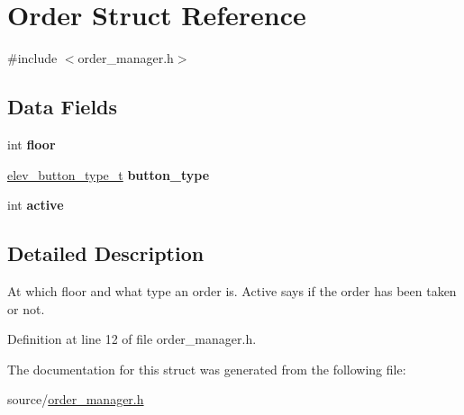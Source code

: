 \hypertarget{structOrder}{}\section{Order Struct Reference}
\label{structOrder}


{\ttfamily \#include $<$order\+\_\+manager.\+h$>$}

\subsection*{Data Fields}
\begin{DoxyCompactItemize}
\item 
int {\bfseries floor}\hypertarget{structOrder_a5243dc659272f25ee0b39a569b9bbd43}{}\label{structOrder_a5243dc659272f25ee0b39a569b9bbd43}

\item 
\hyperlink{elev__driver_8h_af61c4136fb437a2c49037e5a57c9abda}{elev\+\_\+button\+\_\+type\+\_\+t} {\bfseries button\+\_\+type}\hypertarget{structOrder_ade4d2b052791eb51462ee221d833eeb4}{}\label{structOrder_ade4d2b052791eb51462ee221d833eeb4}

\item 
int {\bfseries active}\hypertarget{structOrder_ae636e03956cfac91b4845f22787770b3}{}\label{structOrder_ae636e03956cfac91b4845f22787770b3}

\end{DoxyCompactItemize}


\subsection{Detailed Description}
At which floor and what type an order is. Active says if the order has been taken or not. 

Definition at line 12 of file order\+\_\+manager.\+h.



The documentation for this struct was generated from the following file\+:\begin{DoxyCompactItemize}
\item 
source/\hyperlink{order__manager_8h}{order\+\_\+manager.\+h}\end{DoxyCompactItemize}

